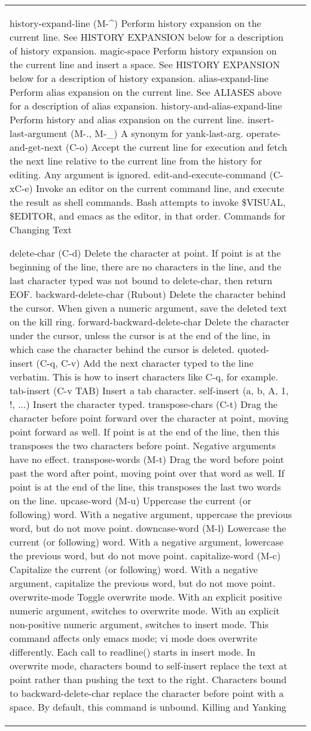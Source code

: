 \documentclass[11pt]{article}
\begin{document}
\begin{longtable}{p{}p{}}
{{{history-expand-line (M-^)
Perform history expansion on the current line. See HISTORY EXPANSION below for a description of history expansion.
magic-space
Perform history expansion on the current line and insert a space. See HISTORY EXPANSION below for a description of history expansion.
alias-expand-line
Perform alias expansion on the current line. See ALIASES above for a description of alias expansion.
history-and-alias-expand-line
Perform history and alias expansion on the current line.
insert-last-argument (M-., M-_)
A synonym for yank-last-arg.
operate-and-get-next (C-o)
Accept the current line for execution and fetch the next line relative to the current line from the history for editing. Any argument is ignored.
edit-and-execute-command (C-xC-e)
Invoke an editor on the current command line, and execute the result as shell commands. Bash attempts to invoke \$VISUAL, \$EDITOR, and emacs as the editor, in that order.
Commands for Changing Text

delete-char (C-d)
Delete the character at point. If point is at the beginning of the line, there are no characters in the line, and the last character typed was not bound to delete-char, then return EOF.
backward-delete-char (Rubout)
Delete the character behind the cursor. When given a numeric argument, save the deleted text on the kill ring.
forward-backward-delete-char
Delete the character under the cursor, unless the cursor is at the end of the line, in which case the character behind the cursor is deleted.
quoted-insert (C-q, C-v)
Add the next character typed to the line verbatim. This is how to insert characters like C-q, for example.
tab-insert (C-v TAB)
Insert a tab character.
self-insert (a, b, A, 1, !, ...)
Insert the character typed.
transpose-chars (C-t)
Drag the character before point forward over the character at point, moving point forward as well. If point is at the end of the line, then this transposes the two characters before point. Negative arguments have no effect.
transpose-words (M-t)
Drag the word before point past the word after point, moving point over that word as well. If point is at the end of the line, this transposes the last two words on the line.
upcase-word (M-u)
Uppercase the current (or following) word. With a negative argument, uppercase the previous word, but do not move point.
downcase-word (M-l)
Lowercase the current (or following) word. With a negative argument, lowercase the previous word, but do not move point.
capitalize-word (M-c)
Capitalize the current (or following) word. With a negative argument, capitalize the previous word, but do not move point.
overwrite-mode
Toggle overwrite mode. With an explicit positive numeric argument, switches to overwrite mode. With an explicit non-positive numeric argument, switches to insert mode. This command affects only emacs mode; vi mode does overwrite differently. Each call to readline() starts in insert mode. In overwrite mode, characters bound to self-insert replace the text at point rather than pushing the text to the right. Characters bound to backward-delete-char replace the character before point with a space. By default, this command is unbound.
Killing and Yanking

}}}
\end{longtable}
\end{document}
